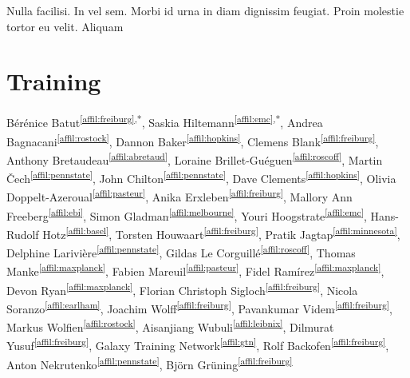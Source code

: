 \begin{savequote}[75mm]
Nulla facilisi. In vel sem. Morbi id urna in diam dignissim feugiat. Proin molestie tortor eu velit. Aliquam
\end{savequote}

\chapter{Training}
\label{training}
\setcounter{figure}{-1}
\setcounter{table}{-1}
\setcounter{section}{-1}

\newpage
{}
Bérénice Batut\textsuperscript{\ref{affil:freiburg},*},
Saskia Hiltemann\textsuperscript{\ref{affil:emc},*},
Andrea Bagnacani\textsuperscript{\ref{affil:rostock}},
Dannon Baker\textsuperscript{\ref{affil:hopkins}},
Clemens Blank\textsuperscript{\ref{affil:freiburg}},
Anthony Bretaudeau\textsuperscript{\ref{affil:abretaud}},
Loraine Brillet-Guéguen\textsuperscript{\ref{affil:roscoff}},
Martin Čech\textsuperscript{\ref{affil:pennstate}},
John Chilton\textsuperscript{\ref{affil:pennstate}},
Dave Clements\textsuperscript{\ref{affil:hopkins}},
Olivia Doppelt-Azeroual\textsuperscript{\ref{affil:pasteur}},
Anika Erxleben\textsuperscript{\ref{affil:freiburg}},
Mallory Ann Freeberg\textsuperscript{\ref{affil:ebi}},
Simon Gladman\textsuperscript{\ref{affil:melbourne}},
Youri Hoogstrate\textsuperscript{\ref{affil:emc}},
Hans-Rudolf Hotz\textsuperscript{\ref{affil:basel}},
Torsten Houwaart\textsuperscript{\ref{affil:freiburg}},
Pratik Jagtap\textsuperscript{\ref{affil:minnesota}},
Delphine Larivière\textsuperscript{\ref{affil:pennstate}},
Gildas Le Corguillé\textsuperscript{\ref{affil:roscoff}},
Thomas Manke\textsuperscript{\ref{affil:maxplanck}},
Fabien Mareuil\textsuperscript{\ref{affil:pasteur}},
Fidel Ramírez\textsuperscript{\ref{affil:maxplanck}},
Devon Ryan\textsuperscript{\ref{affil:maxplanck}},
Florian Christoph Sigloch\textsuperscript{\ref{affil:freiburg}},
Nicola Soranzo\textsuperscript{\ref{affil:earlham}},
Joachim Wolff\textsuperscript{\ref{affil:freiburg}},
Pavankumar Videm\textsuperscript{\ref{affil:freiburg}},
Markus Wolfien\textsuperscript{\ref{affil:rostock}},
Aisanjiang Wubuli\textsuperscript{\ref{affil:leibnix}},
Dilmurat Yusuf\textsuperscript{\ref{affil:freiburg}},
Galaxy Training Network\textsuperscript{\ref{affil:gtn}},
Rolf Backofen\textsuperscript{\ref{affil:freiburg}},
Anton Nekrutenko\textsuperscript{\ref{affil:pennstate}},
Björn Grüning\textsuperscript{\ref{affil:freiburg}}

